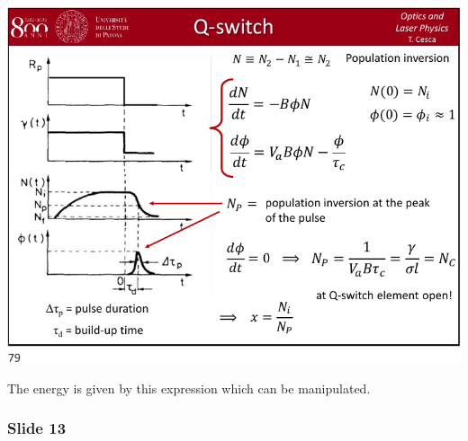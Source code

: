 \documentclass[../main/main.tex]{subfiles}
\begin{document}
\begin{minipage}[]{0.5\linewidth}
\centering
\includegraphics[page=12,width=1\textwidth]{../lessons/pdf_file/15_lecture.pdf}
\end{minipage}
\hspace{0.3cm}\vspace{0.3cm}
\begin{minipage}[c]{0.47\linewidth}

The energy is given by this expression which can be manipulated.

\end{minipage}

\subsubsection*{Slide 13}
\end{document}
